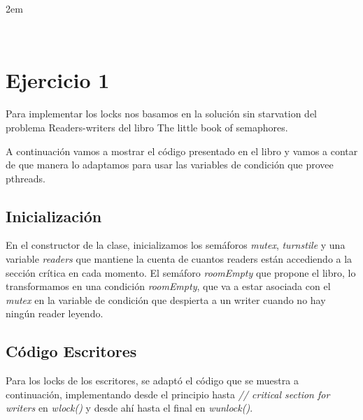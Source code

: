\documentclass[a4,11pt]{article}
\begin{document}

\maketitle

\parindent 2em %
\parskip 4pt %
\renewcommand{\baselinestretch}{1.5}

\,
\clearpage
\hbox{}
\thispagestyle{empty}


\setcounter{section}{0}

\newpage

\section{Ejercicio 1}
Para implementar los locks nos basamos en la solución sin starvation del problema Readers-writers del libro The little book of semaphores.

A continuación vamos a mostrar el código presentado en el libro y vamos a contar de que manera lo adaptamos para usar las variables de condición que provee pthreads.

\subsection{Inicialización}
En el constructor de la clase, inicializamos los semáforos \emph{mutex}, \emph{turnstile} y una variable \emph{readers} que mantiene la cuenta de cuantos readers están accediendo a la sección crítica en cada momento. El semáforo \emph{roomEmpty} que propone el libro, lo transformamos en una condición \emph{roomEmpty}, que va a estar asociada con el \emph{mutex} en la variable de condición que despierta a un writer cuando no hay ningún reader leyendo.


\subsection{Código Escritores}
Para los locks de los escritores, se adaptó el código que se muestra a continuación, implementando desde el principio hasta \emph{// critical section for writers} en \emph{wlock()} y desde ahí hasta el final en \emph{wunlock()}.
\end{document}
